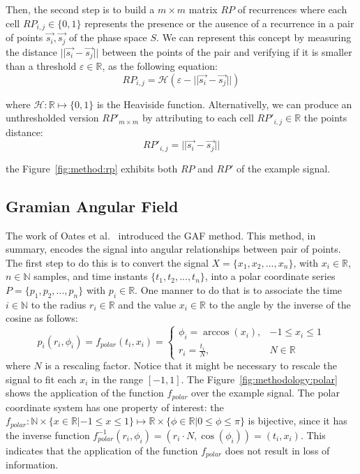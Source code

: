 

Then, the second step is to build a $m \times m$ matrix $RP$ of recurrences where each cell $RP_{i,j} \in \{0,1\}$ represents the presence or the ausence of a recurrence in a pair of points $\vec{s_i},\vec{s_j}$ of the phase space $S$. We can represent this concept by measuring the distance $||\vec{s_i} - \vec{s_j}||$ between the points of the pair and verifying if it is smaller than a threshold $\varepsilon \in \mathbb{R}$, as the following equation:
\begin{equation}
    RP_{i,j} = \mathcal{H}(\varepsilon - ||\vec{s_i} - \vec{s_j}||)
\end{equation}

\noindent where $\mathcal{H}: \mathbb{R} \mapsto \{0,1\}$ is the Heaviside function. Alternativelly, we can produce an unthresholded version $RP'_{m \times m}$ by attributing to each cell $RP'_{i,j} \in \mathbb{R}$ the points distance:
\begin{equation}
    RP'_{i,j} = ||\vec{s_i} - \vec{s_j}||
\end{equation}  

\noindent the Figure~\ref{fig:method:rp} exhibits both $RP$ and $RP'$ of the example signal.




\subsection{Gramian Angular Field}

The work of Oates et al.~\cite{gaf-mtf-1} introduced the \gls{GAF} method. This method, in summary, encodes the signal into angular relationships between pair of points. The first step to do this is to convert the signal $X=\{x_1,x_2,...,x_n\}$, with $x_i \in \mathbb{R}$, $n \in \mathbb{N}$ samples, and time instants $\{t_1,t_2,...,t_n\}$, into a polar coordinate series $P=\{p_1,p_2,...,p_n\}$ with $p_i \in \mathbb{R}$. One manner to do that is to associate the time $i \in \mathbb{N}$ to the radius $r_i \in \mathbb{R}$ and the value $x_i \in \mathbb{R}$ to the angle by the inverse of the cosine as follows:
\begin{equation}
    p_i(r_i, \phi_i) = f_{polar}(t_i, x_i) = 
    \begin{cases} 
        \phi_i = \arccos(x_i), & -1 \leq x_i \leq 1\\
        r_i = \frac{t_i}{N},     & N \in \mathbb{R}
    \end{cases}
\end{equation}
\noindent where $N$ is a rescaling factor. Notice that it might be necessary to rescale the signal to fit each $x_i$ in the range $[-1,1]$. The Figure~\ref{fig:methodology:polar} shows the application of the function $f_{polar}$ over the example signal. The polar coordinate system has one property of interest: the $f_{polar}: \mathbb{N} \times \{x \in \mathbb{R}| -1 \leq x \leq 1\} \mapsto \mathbb{R} \times \{\phi \in \mathbb{R}| 0 \leq \phi \leq \pi \}$ is bijective, since it has the inverse function $f_{polar}^{-1}(r_i, \phi_i)=(r_i \cdot N, \cos(\phi_i))=(t_i,x_i)$. This indicates that the application of the function $f_{polar}$ does not result in loss of information.

